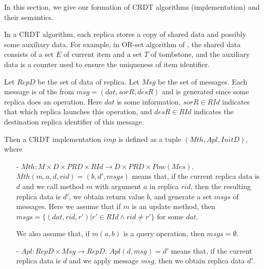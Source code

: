 




















\forget
{
In this section, we give our formation of CRDT algorithms (implementation) and their semantics.

In a CRDT algorithm, each replica stores a copy of shared data and possibly some auxiliary data. For example, in OR-set algorithm of \cite{Bieniusa:2012}, the shared data consists of a set $E$ of current item and a set $T$ of tombstone, and the auxiliary data is a counter used to ensure the uniqueness of item identifier.

Let $RepD$ be the set of data of replica. Let $Msg$ be the set of messages. Each message is of the from $msg=(dat,sorR,desR)$ and is generated since some replica does an operation. Here $dat$ is some information, %
$sorR \in RId$ indicates that which replica launches this operation, and $desR \in RId$ indicates the destination replica identifier of this message. %

Then a CRDT implementation $imp$ is defined as a tuple $(Mth,Apl,InitD)$, where

\begin{itemize}
\setlength{\itemsep}{0.5pt}
\item[-] $Mth: M \times D \times PRD \times RId \rightarrow D \times PRD \times Pow(Mes)$. $Mth(m,a,d,rid) = (b,d',msgs)$ means that, if the current replica data is $d$ and we call method $m$ with argument $a$ in replica $rid$, then the resulting replica data is $d'$, we obtain return value $b$, and generate a set $msgs$ of messages. Here we assume that if $m$ is an update method, then $msgs = \{ (dat,rid,r') \vert r' \in RId \wedge rid \neq r' \}$ for some $dat$. %

    We also assume that, if $m(a,b)$ is a query operation, then $msgs = \emptyset$.

\item[-] $Apl: RepD \times Msg \rightarrow RepD$. $Apl(d,msg) = d'$ means that, if the current replica data is $d$ and we apply message $msg$, then we obtain replica data $d'$.


\end{itemize}}
